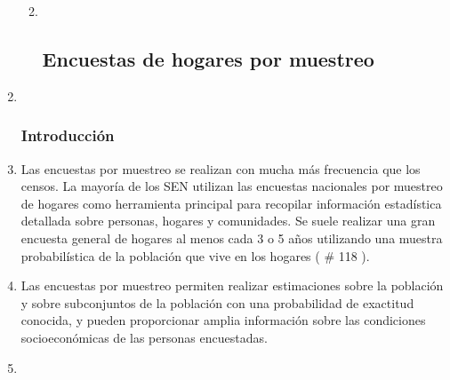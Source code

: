 \documentclass[
]{book}
\begin{document}
\begin{enumerate}
  \begin{enumerate}
  \def\labelenumii{\arabic{enumii}.}
  \item ~
    \hypertarget{encuestas-de-hogares-por-muestreo}{%
    \subsection{Encuestas de hogares por muestreo}\label{encuestas-de-hogares-por-muestreo}}
  \end{enumerate}
\item ~
  \hypertarget{introducciuxf3n-6}{%
  \subsubsection{Introducción}\label{introducciuxf3n-6}}
\item
  Las encuestas por muestreo se realizan con mucha más frecuencia que los censos. La mayoría de los SEN utilizan las encuestas nacionales por muestreo de hogares como herramienta principal para recopilar información estadística detallada sobre personas, hogares y comunidades. Se suele realizar una gran encuesta general de hogares al menos cada 3 o 5 años utilizando una muestra probabilística de la población que vive en los hogares (
  \# 118
  ).
\item
  Las encuestas por muestreo permiten realizar estimaciones sobre la población y sobre subconjuntos de la población con una probabilidad de exactitud conocida, y pueden proporcionar amplia información sobre las condiciones socioeconómicas de las personas encuestadas.
\item ~
  \hypertarget{posibilidades-y-dificultades-de-utilizar-las-encuestas-de-hogares-por-muestreo-para-estimar-el-nuxfamero-de-pdi}{%
}
\end{enumerate}
\end{document}
